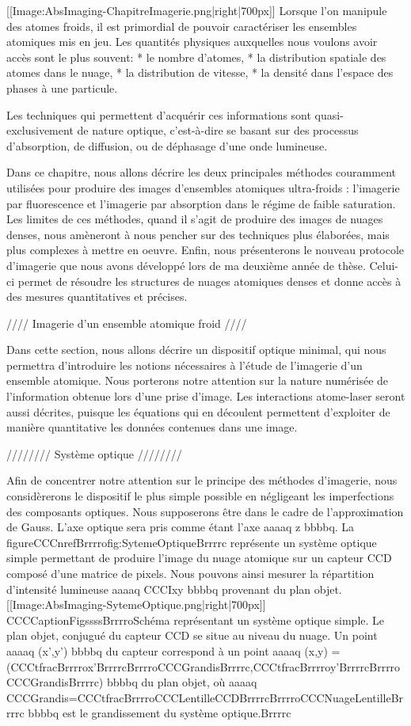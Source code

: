 [[Image:AbsImaging-ChapitreImagerie.png|right|700px]]
Lorsque l'on manipule des atomes froids, il est primordial de pouvoir caractériser les ensembles atomiques mis en jeu.
Les quantités physiques auxquelles nous voulons avoir accès sont le plus souvent:
	* le nombre d'atomes,
	* la distribution spatiale des atomes dans le nuage,
	* la distribution de vitesse,
	* la densité dans l'espace des phases à une particule.

Les techniques qui permettent d'acquérir ces informations sont quasi-exclusivement de nature optique, c'est-à-dire se basant sur des processus d'absorption, de diffusion, ou de déphasage d'une onde lumineuse.

Dans ce chapitre, nous allons décrire les deux principales méthodes couramment utilisées pour produire des images d'ensembles atomiques ultra-froids : l'imagerie par fluorescence et l'imagerie par absorption dans le régime de faible saturation. Les limites de ces méthodes, quand il s'agit de produire des images de nuages denses, nous amèneront à nous pencher sur des techniques plus élaborées, mais plus complexes à mettre en oeuvre. 
Enfin, nous présenterons le nouveau protocole d'imagerie que nous avons développé lors de ma deuxième année de thèse. Celui-ci permet de résoudre les structures de nuages atomiques denses et donne accès à des mesures quantitatives et précises.


//// Imagerie d'un ensemble atomique froid ////

Dans cette section, nous allons décrire un dispositif optique minimal, qui nous permettra d'introduire les notions nécessaires à l'étude de l'imagerie d'un ensemble atomique. Nous porterons notre attention sur la nature numérisée de l'information obtenue lors d'une prise d'image. Les interactions atome-laser seront aussi décrites, puisque les équations qui en découlent permettent d'exploiter de manière quantitative les données contenues dans une image.


//////// Système optique ////////

Afin de concentrer notre attention sur le principe des méthodes d'imagerie, nous considèrerons le dispositif le plus simple possible en négligeant les imperfections des composants optiques. Nous supposerons être dans le cadre de l'approximation de Gauss. 
L'axe optique sera pris comme étant l'axe aaaaq z bbbbq. 
La figureCCCnrefBrrrrofig:SytemeOptiqueBrrrrc représente un système optique simple permettant de produire l'image du nuage atomique sur un capteur CCD composé d'une matrice de pixels. Nous pouvons ainsi mesurer la répartition d'intensité lumineuse aaaaq CCCIxy bbbbq provenant du plan objet.
[[Image:AbsImaging-SytemeOptique.png|right|700px]]
CCCCaptionFigssssBrrrroSchéma représentant un système optique simple. Le plan objet, conjugué du capteur CCD se situe au niveau du nuage. Un point aaaaq (x',y') bbbbq du capteur correspond à un point aaaaq (x,y) = (CCCtfracBrrrrox'BrrrrcBrrrroCCCGrandisBrrrrc,CCCtfracBrrrroy'BrrrrcBrrrroCCCGrandisBrrrrc) bbbbq du plan objet, où aaaaq CCCGrandis=CCCtfracBrrrroCCCLentilleCCDBrrrrcBrrrroCCCNuageLentilleBrrrrc bbbbq est le grandissement du système optique.Brrrrc




